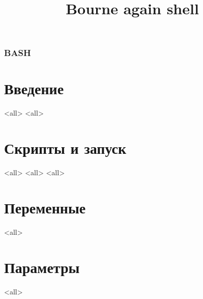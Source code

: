 
\title[bash]{Bourne again shell}




\begin{frame}
	\frametitle{BASH}
	\titlepage
	\vspace{-0.5cm}
	\begin{center}
	\end{center}
\end{frame}


\section{Введение}

\mode<all>{}
\mode<all>{}

\section[Runtime]{Скрипты и запуск}
\mode<all>{}
\mode<all>{}
\mode<all>{}

\section{Переменные}

\mode<all>{}

\section{Параметры}

\mode<all>{}





